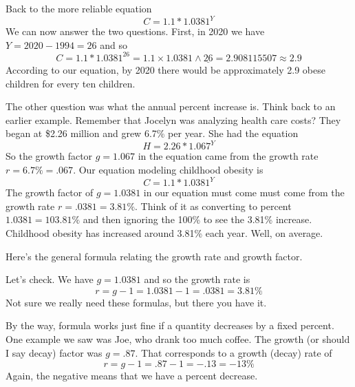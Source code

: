 Back to the more reliable equation $$C = 1.1 \ast 1.0381^Y$$
We can now answer the two questions. First, in 2020 we have $Y = 2020-1994 = 26$ and so $$C = 1.1 \ast 1.0381^{26} = 1.1 \times 1.0381 \wedge \underline{26} = 2.908115507 \approx 2.9$$
According to our equation, by 2020 there would be approximately 2.9 obese children for every ten children.

The other question was what the annual percent increase is.  Think back to an earlier example.  Remember that Jocelyn was analyzing health care costs?  They began at \$2.26 million and grew 6.7\% per year.  She had the equation 
$$H=2.26\ast1.067^Y$$
So the growth factor $g=1.067$ in the equation came from the growth rate $r=6.7\%=.067$.
Our equation modeling childhood obesity is $$C = 1.1 \ast 1.0381^Y$$ 
The growth factor of $g=1.0381$ in our equation must come must come from the growth rate $r= .0381=3.81\%$. Think of it as converting to percent $1.0381 = 103.81 \%$ and then ignoring the 100\% to see the 3.81\% increase.
Childhood obesity has increased around 3.81\% each year.  Well, on average.
 
Here's the general formula relating the growth rate and growth factor.

 \bigskip
\bigskip

\noindent Let's check.  We have $g=1.0381$ and so the growth rate is 
$$r=g-1 = 1.0381-1 = .0381= 3.81\%$$
Not sure we really need these formulas, but there you have it.

By the way, formula works just fine if a quantity decreases by a fixed percent. One example we saw was Joe, who drank too much coffee.  The growth (or should I say decay) factor was $g=.87$.  That corresponds to a growth (decay) rate of 
$$r=g-1=.87-1=-.13=-13\%$$
Again, the negative means that we have a percent decrease.


